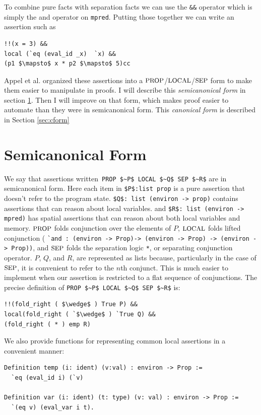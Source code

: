 \documentclass{puthesis}
\begin{document}
To combine pure facts with separation facts we can use the
\lstinline|&&| operator which is simply the and operator on
\lstinline|mpred|. Putting those together we can write an assertion
such as

\begin{lstlisting}
!!(x = 3) &&
local (`eq (eval_id _x)  `x) &&
(p1 $\mapsto$ x * p2 $\mapsto$ 5)cc
\end{lstlisting}

Appel et al. \cite{appel14:plcc} organized these assertions into a $\mbox{\small PROP}$/$\mbox{\small LOCAL}$/$\mbox{\small SEP}$
form to make them easier to manipulate in proofs. I will describe this
\emph{semicanonical form} in section \ref{sec:scform}. Then I will
improve on that form, which makes proof easier to automate than
they were in semicanonical form. This \emph{canonical form} is
described in Section \ref{sec:cform}

\section{Semicanonical Form}
\label{sec:scform}
We say that assertions written~\lstinline{PROP $~P$ LOCAL $~Q$ SEP $~R$}  
are in semicanonical form. Here each item in
\lstinline|$P$:list prop| is a pure assertion that doesn't refer to
the program state. \lstinline|$Q$: list (environ -> prop)| contains
assertions that can reason about local variables.  and 
\lstinline|$R$: list (environ -> mpred)| has spatial assertions that can reason about
both local variables and memory.  $\mbox{\small PROP}$ folds conjunction over the
elements of $P$, $\mbox{\small LOCAL}$ folds lifted conjunction ( 
\lstinline|`and : (environ -> Prop)-> (environ -> Prop) -> (environ -> Prop))|, and
$\mbox{\small SEP}$ folds the separation logic \lstinline|*|, or separating
conjunction operator. $P$, $Q$, and $R$, are represented as lists
because, particularly in the case of $\mbox{\small SEP}$, it is convenient to refer
to the $n$th conjunct. This is much easier to implement when our
assertion is restricted to a flat sequence of conjunctions. The
precise definition of \lstinline{PROP $~P$ LOCAL $~Q$ SEP $~R$} is:

\begin{lstlisting}
!!(fold_right ( $\wedge$ ) True P) &&
local(fold_right ( `$\wedge$ ) `True Q) &&
(fold_right ( * ) emp R)
\end{lstlisting}

We also provide functions for representing common local assertions in
a convenient manner:

\begin{lstlisting}
Definition temp (i: ident) (v:val) : environ -> Prop :=
  `eq (eval_id i) (`v)

Definition var (i: ident) (t: type) (v: val) : environ -> Prop :=
  `(eq v) (eval_var i t).
\end{lstlisting}
\end{document}
